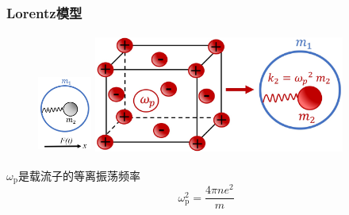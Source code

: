 %
\frame
{
	\frametitle{\textrm{Lorentz}模型}
\begin{figure}[h!]
\centering
\vspace*{-5pt}
\includegraphics[height=1.05in,width=0.7in,viewport=0 0 380 550,clip]{Figures/A_mechanical_model_giving_rise_to_the_negative_effective_mass_effect.jpg}
\includegraphics[height=1.55in,width=3.25in,viewport=0 0 1300 600,clip]{Figures/Equivalent_mechanical_scheme_of_electron_gas_in_ionic_lattice.jpg}
\caption{\fontsize{5.5pt}{4.2pt}}%
\label{Electron-gas-in-lattice}
\end{figure} 
			$\omega_{\mathrm{p}}$是载流子的等离振荡频率
			\begin{displaymath}
				\omega_{\mathrm{p}}^2=\frac{4\pi ne^2}m
			\end{displaymath}
}


